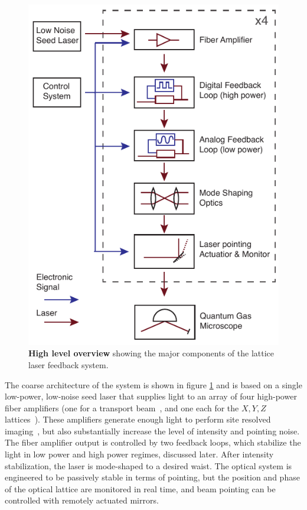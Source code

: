 \documentclass[twocolumn,aps,pra,showpacs,preprintnumbers,bibnotes]{revtex4-1}
\begin{document}
\begin{figure}
  \begin{center}
    \includegraphics{fig/figure1/figure1.pdf}
    \caption{\textbf{High level overview} showing the major components of the lattice laser feedback system.}\label{fig:high_level}
  \end{center}
\end{figure}

The coarse architecture of the system is shown in figure \ref{fig:high_level} and is based on a single low-power, low-noise seed laser that supplies light to an array of four high-power fiber amplifiers (one for a transport beam~\cite{Huber2014}, and one each for the $X,Y,Z$ lattices~\cite{Parsons2016}).
These amplifiers generate enough light to perform site resolved imaging~\cite{Parsons2015}, but also substantially increase the level of intensity and pointing noise. 
The fiber amplifier output is controlled by two feedback loops, which stabilize the light in low power and high power regimes, discussed later.
After intensity stabilization, the laser is mode-shaped to a desired waist.
The optical system is engineered to be passively stable in terms of pointing, but the position and phase of the optical lattice are monitored in real time, and beam pointing can be controlled with remotely actuated mirrors.
\end{document}
